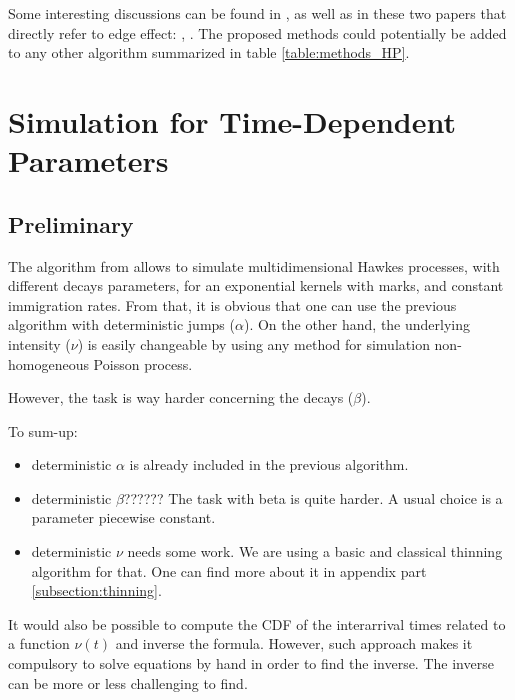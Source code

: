 Some interesting discussions can be found in \cite{daley}, as well as in these two papers that directly refer to edge effect: \cite{cox}, \cite{rasmussen}. The proposed methods could potentially be added to any other algorithm summarized in table \ref{table:methods_HP}.




\section{Simulation for Time-Dependent Parameters}
\subsection{Preliminary}

The algorithm from \cite{my_algo_simul} allows to simulate multidimensional Hawkes processes, with different decays parameters, for an exponential kernels with marks, and constant immigration rates. From that, it is obvious that one can use the previous algorithm with deterministic jumps ($\alpha$). On the other hand, the underlying intensity ($\nu$) is easily changeable by using any method for simulation non-homogeneous Poisson process.

However, the task is way harder concerning the decays ($\beta$).

To sum-up:
\begin{itemize}
\item deterministic $\alpha$ is already included in the previous algorithm.
\item deterministic $\beta$??????  The task with beta is quite harder. A usual choice is a parameter piecewise constant. 
\item deterministic $\nu$ needs some work. We are using a basic and classical thinning algorithm for that. One can find more about it in appendix part \ref{subsection:thinning}.
\end{itemize}





It would also be possible to compute the CDF of the interarrival times related to a function $\nu(t)$ and inverse the formula. However, such approach makes it compulsory to solve equations by hand in order to find the inverse. The inverse can be more or less challenging to find. 


